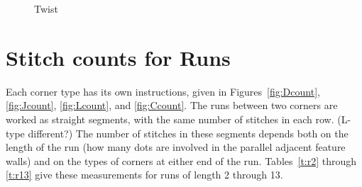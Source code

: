 \documentclass[openany]{book}
\begin{document}
\begin{figure}[H]\centering
{}
\caption{Twist}\label{fig:T}
\end{figure}

\section{Stitch counts for Runs}\label{Asec:runcount}

Each corner type has its own instructions, given in Figures~\ref{fig:Dcount}, \ref{fig:Jcount}, \ref{fig:Lcount}, and \ref{fig:Ccount}. The runs between two corners are worked as straight segments, with the same number of stitches in each row.  (L-type different?) The number of stitches in these segments depends both on the length of the run (how many dots are involved in the parallel adjacent feature walls) and on the types of corners at either end of the run. Tables~\ref{t:r2} through \ref{t:r13} give these measurements for runs of length 2 through 13.
\end{document}
